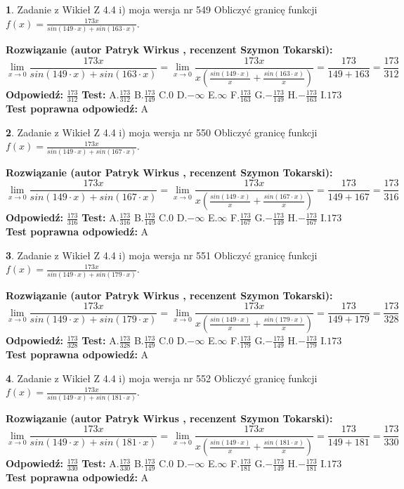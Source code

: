 \documentclass[12pt, a4paper]{article}
\theoremstyle{definition} %
\newtheorem{zad}{}
\newcommand{\zadStart}[1]{\begin{zad}#1\newline}
\newcommand{\zadStop}{\end{zad}}
\newcommand{\rozwStart}[2]{\noindent \textbf{Rozwiązanie (autor #1 , recenzent #2): }\newline}
\newcommand{\rozwStop}{\newline}
\newcommand{\odpStart}{\noindent \textbf{Odpowiedź:}\newline}
\newcommand{\odpStop}{\newline}
\newcommand{\testStart}{\noindent \textbf{Test:}\newline}
\newcommand{\testStop}{\newline}
\newcommand{\kluczStart}{\noindent \textbf{Test poprawna odpowiedź:}\newline}
\newcommand{\kluczStop}{\newline}
\begin{document}
\zadStart{Zadanie z Wikieł Z 4.4 i) moja wersja nr 549}
Obliczyć granicę funkcji $f(x)=\frac{173x}{sin(149\cdot x) +sin(163\cdot x)}$.
\zadStop
\rozwStart{Patryk Wirkus}{Szymon Tokarski}
$$\lim\limits_{x\to 0}\frac{173x}{sin(149\cdot x) +sin(163\cdot x)}=\lim\limits_{x\to 0}\frac{173x}{x(\frac{sin(149\cdot x)}{x}+\frac{sin(163\cdot x)}{x})}=\frac{173}{149+163} = \frac{173}{312}$$
\rozwStop
\odpStart
$\frac{173}{312}$
\odpStop
\testStart
A.$\frac{173}{312}$
B.$\frac{173}{149}$
C.$0$
D.$-\infty$
E.$\infty$
F.$\frac{173}{163}$
G.$-\frac{173}{149}$
H.$-\frac{173}{163}$
I.$173$
\testStop
\kluczStart
A
\kluczStop



\zadStart{Zadanie z Wikieł Z 4.4 i) moja wersja nr 550}
Obliczyć granicę funkcji $f(x)=\frac{173x}{sin(149\cdot x) +sin(167\cdot x)}$.
\zadStop
\rozwStart{Patryk Wirkus}{Szymon Tokarski}
$$\lim\limits_{x\to 0}\frac{173x}{sin(149\cdot x) +sin(167\cdot x)}=\lim\limits_{x\to 0}\frac{173x}{x(\frac{sin(149\cdot x)}{x}+\frac{sin(167\cdot x)}{x})}=\frac{173}{149+167} = \frac{173}{316}$$
\rozwStop
\odpStart
$\frac{173}{316}$
\odpStop
\testStart
A.$\frac{173}{316}$
B.$\frac{173}{149}$
C.$0$
D.$-\infty$
E.$\infty$
F.$\frac{173}{167}$
G.$-\frac{173}{149}$
H.$-\frac{173}{167}$
I.$173$
\testStop
\kluczStart
A
\kluczStop



\zadStart{Zadanie z Wikieł Z 4.4 i) moja wersja nr 551}
Obliczyć granicę funkcji $f(x)=\frac{173x}{sin(149\cdot x) +sin(179\cdot x)}$.
\zadStop
\rozwStart{Patryk Wirkus}{Szymon Tokarski}
$$\lim\limits_{x\to 0}\frac{173x}{sin(149\cdot x) +sin(179\cdot x)}=\lim\limits_{x\to 0}\frac{173x}{x(\frac{sin(149\cdot x)}{x}+\frac{sin(179\cdot x)}{x})}=\frac{173}{149+179} = \frac{173}{328}$$
\rozwStop
\odpStart
$\frac{173}{328}$
\odpStop
\testStart
A.$\frac{173}{328}$
B.$\frac{173}{149}$
C.$0$
D.$-\infty$
E.$\infty$
F.$\frac{173}{179}$
G.$-\frac{173}{149}$
H.$-\frac{173}{179}$
I.$173$
\testStop
\kluczStart
A
\kluczStop



\zadStart{Zadanie z Wikieł Z 4.4 i) moja wersja nr 552}
Obliczyć granicę funkcji $f(x)=\frac{173x}{sin(149\cdot x) +sin(181\cdot x)}$.
\zadStop
\rozwStart{Patryk Wirkus}{Szymon Tokarski}
$$\lim\limits_{x\to 0}\frac{173x}{sin(149\cdot x) +sin(181\cdot x)}=\lim\limits_{x\to 0}\frac{173x}{x(\frac{sin(149\cdot x)}{x}+\frac{sin(181\cdot x)}{x})}=\frac{173}{149+181} = \frac{173}{330}$$
\rozwStop
\odpStart
$\frac{173}{330}$
\odpStop
\testStart
A.$\frac{173}{330}$
B.$\frac{173}{149}$
C.$0$
D.$-\infty$
E.$\infty$
F.$\frac{173}{181}$
G.$-\frac{173}{149}$
H.$-\frac{173}{181}$
I.$173$
\testStop
\kluczStart
A
\kluczStop
\end{document}
